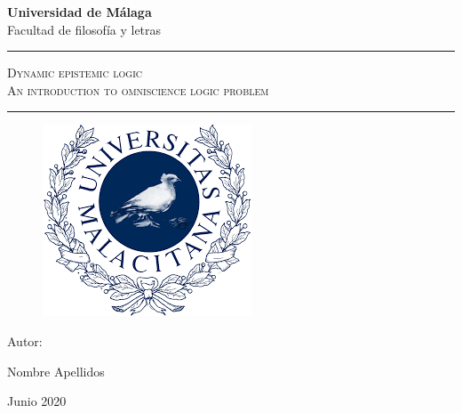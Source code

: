 \documentclass[a4paper]{book}
\begin{document}
\begin{titlepage}
	\centering
	{\LARGE \textbf{Universidad de Málaga}} \\
	\vspace{0.5cm}
	{\Large Facultad de filosofía y letras} \\
	\vspace{2cm}
	\hrule
	\vspace{1cm}
	{\Huge  \textsc{Dynamic epistemic logic}}\\
	\vspace{0.5cm}
	{\Large \textsc{An introduction to  omniscience logic problem}}
	\vspace{1cm}
	\hrule
	\vspace{1cm}
	\begin{figure}[!h]
		\centering
		\includegraphics[scale=0.5]{index.png}
	\end{figure}
	\vfill
	{\Large Autor: \par}
	{\Large Nombre Apellidos \par}
	\vfill
	{\Large Junio 2020 \par}

\end{titlepage}
\end{document}
